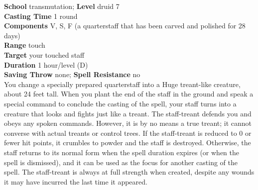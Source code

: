 \textbf{School} transmutation; \textbf{Level} druid 7\\
\textbf{Casting Time} 1 round\\
\textbf{Components} V, S, F (a quarterstaff that has been carved and polished for 28 days)\\
\textbf{Range} touch\\
\textbf{Target} your touched staff\\
\textbf{Duration} 1 hour/level (D)\\
\textbf{Saving Throw} none; \textbf{Spell Resistance} no\\
You change a specially prepared quarterstaff into a Huge treant-like creature, about 24 feet tall. When you plant the end of the staff in the ground and speak a special command to conclude the casting of the spell, your staff turns into a creature that looks and fights just like a treant. The staff-treant defends you and obeys any spoken commands. However, it is by no means a true treant; it cannot converse with actual treants or control trees. If the staff-treant is reduced to 0 or fewer hit points, it crumbles to powder and the staff is destroyed. Otherwise, the staff returns to its normal form when the spell duration expires (or when the spell is dismissed), and it can be used as the focus for another casting of the spell. The staff-treant is always at full strength when created, despite any wounds it may have incurred the last time it appeared.\\
